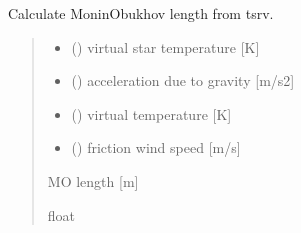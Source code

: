 \documentclass[letterpaper,10pt,english]{sphinxmanual}
\begin{document}
\begin{fulllineitems}

\pysigstartsignatures
{}
\pysigstopsignatures
\sphinxAtStartPar
Calculate Monin\sphinxhyphen{}Obukhov length from tsrv.
\begin{quote}\begin{description}
\begin{itemize}
\item {} 
\sphinxAtStartPar
{} () \textendash{} virtual star temperature {[}K{]}

\item {} 
\sphinxAtStartPar
{} () \textendash{} acceleration due to gravity {[}m/s2{]}

\item {} 
\sphinxAtStartPar
{} () \textendash{} virtual temperature {[}K{]}

\item {} 
\sphinxAtStartPar
{} () \textendash{} friction wind speed {[}m/s{]}

\end{itemize}

\sphinxAtStartPar
{} \textendash{} M\sphinxhyphen{}O length {[}m{]}

\sphinxAtStartPar
float

\end{description}\end{quote}

\end{fulllineitems}
\end{document}
